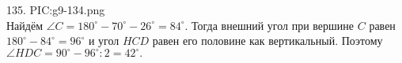 135. {{PIC:g9-134.png}}\\
Найдём $\angle C=180^\circ-70^\circ-26^\circ=84^\circ.$ Тогда внешний угол при вершине $C$ равен $180^\circ-84^\circ=96^\circ$ и угол $HCD$ равен его половине как вертикальный. Поэтому $\angle HDC=90^\circ-96^\circ:2=42^\circ.$\\
